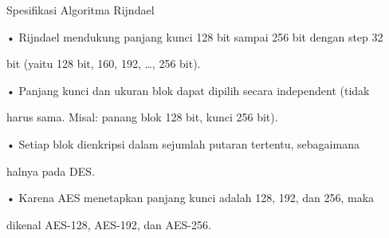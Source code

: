 \documentclass{article}
\begin{document}

Spesifikasi Algoritma Rijndael

• Rijndael mendukung panjang kunci 128 bit sampai 256 bit dengan step 32 

bit (yaitu 128 bit, 160, 192, …, 256 bit).  

• Panjang kunci dan ukuran blok dapat dipilih secara independent (tidak 

harus sama. Misal: panang blok 128 bit, kunci 256 bit). 

• Setiap blok dienkripsi dalam sejumlah putaran tertentu, sebagaimana 

halnya pada DES. 

• Karena AES menetapkan panjang kunci adalah 128, 192, dan 256, maka 

dikenal AES-128, AES-192, dan AES-256.
\end{document}
